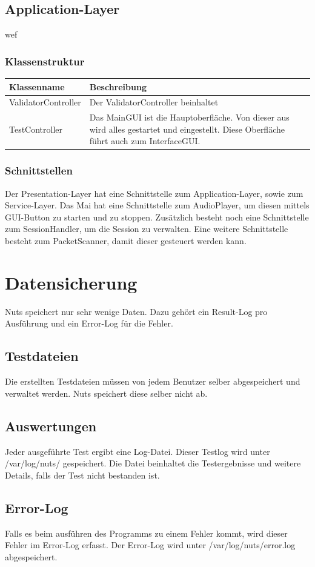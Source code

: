\documentclass[a4,12pt]{scrartcl}
\begin{document}
\subsection{Application-Layer}
wef
\subsubsection{Klassenstruktur}
\begin{table}[H]
\centering
    \begin{tabular}{@{}l p{11cm} @{}}\toprule    
    {Klassenname} & {Beschreibung}\\ \midrule
    ValidatorController & Der ValidatorController beinhaltet  \\       
    TestController & Das MainGUI ist die Hauptoberfläche. Von dieser aus wird alles gestartet und eingestellt. Diese Oberfläche führt auch zum InterfaceGUI. \\
    \bottomrule
    \end{tabular}
\end{table}
\subsubsection{Schnittstellen}
Der Presentation-Layer hat eine Schnittstelle zum Application-Layer, sowie zum Service-Layer. 
Das Mai hat eine Schnittstelle zum AudioPlayer, um diesen mittels GUI-Button zu starten und zu stoppen.
Zusätzlich besteht noch eine Schnittstelle zum SessionHandler, um die Session zu verwalten.
Eine weitere Schnittstelle besteht zum PacketScanner, damit dieser gesteuert werden kann.







\newpage
\section{Datensicherung}
Nuts speichert nur sehr wenige Daten. Dazu gehört ein Result-Log pro Ausführung und ein Error-Log für die Fehler.
\subsection{Testdateien}
Die erstellten Testdateien müssen von jedem Benutzer selber abgespeichert und verwaltet werden. Nuts speichert diese selber nicht ab.
\subsection{Auswertungen}
Jeder ausgeführte Test ergibt eine Log-Datei. Dieser Testlog wird unter /var/log/nuts/ gespeichert. Die Datei beinhaltet die Testergebnisse und weitere Details, falls der Test nicht bestanden ist.
\subsection{Error-Log}
Falls es beim ausführen des Programms zu einem Fehler kommt, wird dieser Fehler im Error-Log erfasst. Der Error-Log wird unter /var/log/nuts/error.log abgespeichert.
\end{document}
